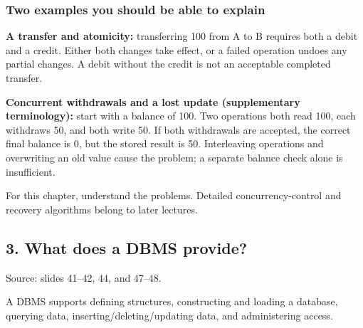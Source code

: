 \subsubsection{Two examples you should be able to explain}\label{01_database_fundamentals_en-two-examples-you-should-be-able-to-explain}

\textbf{A transfer and atomicity:} transferring 100 from A to B requires both a debit and a credit. Either both changes take effect, or a failed operation undoes any partial changes. A debit without the credit is not an acceptable completed transfer.

\textbf{Concurrent withdrawals and a lost update (supplementary terminology):} start with a balance of 100. Two operations both read 100, each withdraws 50, and both write 50. If both withdrawals are accepted, the correct final balance is 0, but the stored result is 50. Interleaving operations and overwriting an old value cause the problem; a separate balance check alone is insufficient.

For this chapter, understand the problems. Detailed concurrency-control and recovery algorithms belong to later lectures.

\subsection{3. What does a DBMS provide?}\label{01_database_fundamentals_en-what-does-a-dbms-provide}

Source: slides 41--42, 44, and 47--48.

A DBMS supports defining structures, constructing and loading a database, querying data, inserting/deleting/updating data, and administering access.

